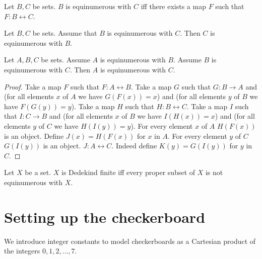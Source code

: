 \documentclass{article}
\begin{document}
\begin{forthel}
    
\begin{definition}
    Let $B, C$ be sets.
    $B$ is equinumerous with $C$ iff there exists a map $F$ such that
    $F : B\leftrightarrow C$.
\end{definition}
    
\begin{lemma}
    Let $B, C$ be sets.
    Assume that $B$ is equinumerous with $C$.
    Then $C$ is equinumerous with $B$.
\end{lemma}

\begin{lemma}
    Let $A, B, C$ be sets.
    Assume $A$ is equinumerous with $B$.
    Assume $B$ is equinumerous with $C$.
    Then $A$ is equinumerous with $C$.
\end{lemma}
\begin{proof}
    Take a map $F$ such that $F : A\leftrightarrow B$.
    Take a map $G$ such that $G : B\rightarrow A$ 
    and (for all elements $x$ of $A$ we have $G(F(x)) = x$) and
    (for all elements $y$ of $B$ we have $F(G(y))=y$).
    Take a map $H$ such that $H : B\leftrightarrow C$.
    Take a map $I$ such that $I : C\rightarrow B$ and (for all elements $x$ of $B$ we have $I(H(x)) = x$) and
    (for all elements $y$ of $C$ we have $H(I(y))=y$).
    For every element $x$ of $A$ $H(F(x))$ is an object.
    Define $J(x) = H(F(x))$ for $x$ in $A$.
    For every element $y$ of $C$ $G(I(y))$ is an object.
    $J : A\leftrightarrow C$. Indeed define $K(y) = G(I(y))$ for $y$ in $C$.
\end{proof}

\begin{definition}
    Let $X$ be a set.
    $X$ is Dedekind finite iff every proper subset of $X$
    is not equinumerous with $X$.
\end{definition}

\end{forthel}




\section{Setting up the checkerboard}

We introduce integer constants
to model checkerboards as a Cartesian product of the
integers $0, 1, 2, \ldots, 7$.
\end{document}
